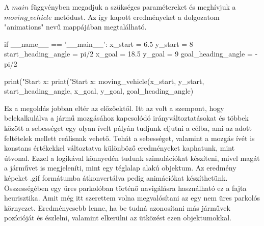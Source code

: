 A $ main $ függvényben megadjuk a szükséges paramétereket és meghívjuk a \\ $ moving\_vehicle $ metódust. Az így kapott eredményeket a dolgozatom "animations" nevű mappájában megtalálható.

\begin{python}
if __name__ == '__main__':
    x_start = 6.5
    y_start = 8
    start_heading_angle = pi/2
    x_goal = 18.5
    y_goal = 9
    goal_heading_angle = -pi/2

    print("Start x: %
    print("Start x: %
    moving_vehicle(x_start, y_start, start_heading_angle, x_goal,
     y_goal, goal_heading_angle)
\end{python}


Ez a megoldás jobban eltér az előzőektől. Itt az volt a szempont, hogy belekalkulálva a jármű mozgásához kapcsolódó irányváltoztatásokat és többek között a sebességet egy olyan ívelt pályán tudjunk eljutni a célba, ami az adott feltételek mellett reálisnak vehető. Tehát a sebességet, valamint a mozgás ívét is konstans értékekkel változtatva különböző eredményeket kaphatunk, mint útvonal. Ezzel a logikával könnyedén tudunk szimulációkat készíteni, mivel magát a járművet is megjeleníti, mint egy téglalap alakú objektum. Az eredmény képeket .gif formátumba átkonvertálva pedig animációkat készíthetünk. Összességében egy üres parkolóban történő navigálásra használható ez a fajta heurisztika. Amit még itt szerettem volna megvalósítani az egy nem üres parkolós környezet. Eredményesebb lenne, ha be tudná azonosítani más járművek pozícióját és észlelni, valamint elkerülni az ütközést ezen objektumokkal. 
